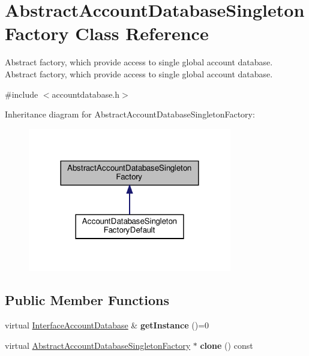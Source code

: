\hypertarget{classAbstractAccountDatabaseSingletonFactory}{}\section{Abstract\+Account\+Database\+Singleton\+Factory Class Reference}
\label{classAbstractAccountDatabaseSingletonFactory}


Abstract factory, which provide access to single global account database.  Abstract factory, which provide access to single global account database.  




{\ttfamily \#include $<$accountdatabase.\+h$>$}



Inheritance diagram for Abstract\+Account\+Database\+Singleton\+Factory\+:\nopagebreak
\begin{figure}[H]
\begin{center}
\leavevmode
\includegraphics[width=252pt]{d7/d46/classAbstractAccountDatabaseSingletonFactory__inherit__graph}
\end{center}
\end{figure}
\subsection*{Public Member Functions}
\begin{DoxyCompactItemize}
\item 
\mbox{\label{classAbstractAccountDatabaseSingletonFactory_a8e2cec9f578de9cc99d83a9a494e886a}} 
virtual \hyperlink{classInterfaceAccountDatabase}{Interface\+Account\+Database} \& {\bfseries get\+Instance} ()=0
\item 
\mbox{\label{classAbstractAccountDatabaseSingletonFactory_a50aec839eeb5934d7de857a5ae4f9e49}} 
virtual \hyperlink{classAbstractAccountDatabaseSingletonFactory}{Abstract\+Account\+Database\+Singleton\+Factory} $\ast$ {\bfseries clone} () const
\end{DoxyCompactItemize}
